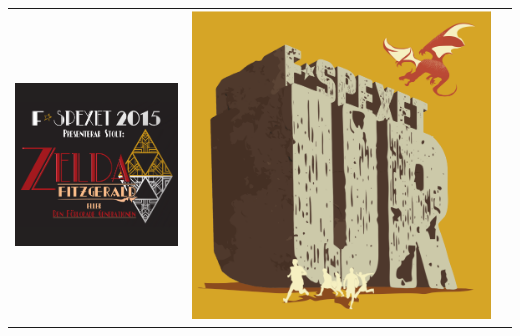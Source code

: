 \begin{tabular}{c c c}
\includegraphics[width=\gamlaAffischerLength]{Bilder/TidigareSpexloggor/ZeldaIcon.png}&
\includegraphics[width=\gamlaAffischerLength]{Bilder/TidigareSpexloggor/UrIcon.png}
\\
\end{tabular}
\vfill
\newpage
